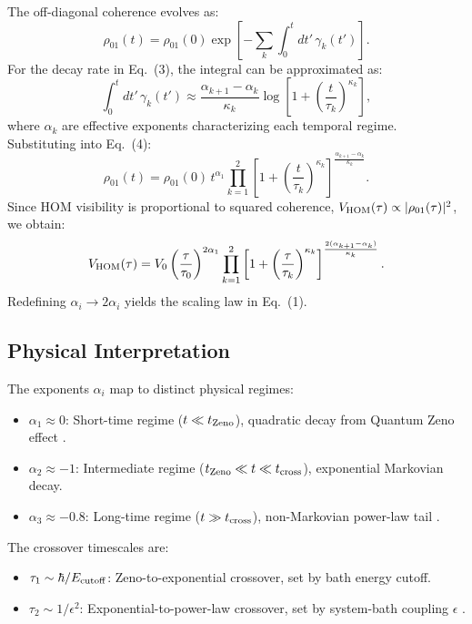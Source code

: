 \documentclass[12pt,a4paper]{article}
\begin{document}
The off-diagonal coherence evolves as:
\begin{equation}
\rho_{01}(t) = \rho_{01}(0) \exp\left[-\sum_k \int_0^t dt' \, \gamma_k(t')\right].
\end{equation}
For the decay rate in Eq.~(3), the integral can be approximated as:
\begin{equation}
\int_0^t dt' \, \gamma_k(t') \approx \frac{\alpha_{k+1} - \alpha_k}{\kappa_k} \log\left[1 + \left(\frac{t}{\tau_k}\right)^{\kappa_k}\right],
\end{equation}
where $\alpha_k$ are effective exponents characterizing each temporal regime. Substituting into Eq.~(4):
\begin{equation}
\rho_{01}(t) = \rho_{01}(0) \, t^{\alpha_1} \prod_{k=1}^2 \left[1 + \left(\frac{t}{\tau_k}\right)^{\kappa_k}\right]^{\frac{\alpha_{k+1}-\alpha_k}{\kappa_k}}.
\end{equation}
Since HOM visibility is proportional to squared coherence, $V_{\rm HOM}(\tau) \propto |\rho_{01}(\tau)|^2$, we obtain:
\begin{equation}
V_{\rm HOM}(\tau) = V_0 \left(\frac{\tau}{\tau_0}\right)^{2\alpha_1} 
\prod_{k=1}^2 \left[1+\left(\frac{\tau}{\tau_k}\right)^{\kappa_k}\right]^{\frac{2(\alpha_{k+1}-\alpha_k)}{\kappa_k}}.
\end{equation}
Redefining $\alpha_i \to 2\alpha_i$ yields the scaling law in Eq.~(1).

\subsection{Physical Interpretation}

The exponents $\alpha_i$ map to distinct physical regimes:
\begin{itemize}
\item $\alpha_1 \approx 0$: Short-time regime ($t \ll t_{\rm Zeno}$), quadratic decay from Quantum Zeno effect \cite{Facchi2008}.
\item $\alpha_2 \approx -1$: Intermediate regime ($t_{\rm Zeno} \ll t \ll t_{\rm cross}$), exponential Markovian decay.
\item $\alpha_3 \approx -0.8$: Long-time regime ($t \gg t_{\rm cross}$), non-Markovian power-law tail \cite{Uchiyama2016}.
\end{itemize}

The crossover timescales are:
\begin{itemize}
\item $\tau_1 \sim \hbar/E_{\rm cutoff}$: Zeno-to-exponential crossover, set by bath energy cutoff.
\item $\tau_2 \sim 1/\epsilon^2$: Exponential-to-power-law crossover, set by system-bath coupling $\epsilon$ \cite{Uchiyama2016}.
\end{itemize}
\end{document}
